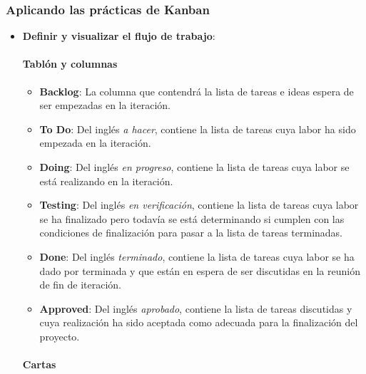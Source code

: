 \subsubsection{Aplicando las prácticas de Kanban}
\begin{itemize}
    \item \textbf{Definir y visualizar el flujo de trabajo}:
    \paragraph{Tablón y columnas}


    \begin{itemize}
        \item \textbf{Backlog}: La columna que contendrá la lista de tareas e ideas
       espera de ser empezadas en la iteración.
        \item \textbf{To Do}: Del inglés \emph{a hacer}, contiene la lista de
        tareas cuya labor ha sido empezada en la iteración.
        \item \textbf{Doing}: Del inglés \emph{en progreso}, contiene la lista de
        tareas cuya labor se está realizando en la iteración.
        \item \textbf{Testing}: Del inglés \emph{en verificación}, contiene la lista de
        tareas cuya labor se ha finalizado pero todavía se está determinando si
        cumplen con las condiciones de finalización para pasar a la lista de tareas
        terminadas.
        \item \textbf{Done}: Del inglés \emph{terminado}, contiene la lista de
        tareas cuya labor se ha dado por terminada y que están en espera de ser
        discutidas en la reunión de fin de iteración.
        \item \textbf{Approved}: Del inglés \emph{aprobado}, contiene la lista de
        tareas discutidas y cuya realización ha sido aceptada como adecuada para la
        finalización del proyecto.
    \end{itemize}

    \paragraph{Cartas}



\end{itemize}
